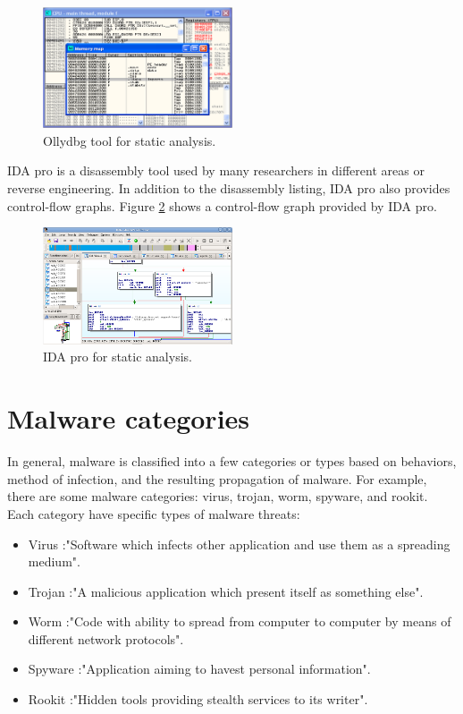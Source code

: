 \begin{figure}[h!]
\centering
\includegraphics[width=0.5\textwidth]{graph/OllyDbg.png}
\caption{Ollydbg tool for static analysis.}
\label{fig:OllyDbg}
\end{figure}

IDA pro is a disassembly tool used by many researchers in different areas or reverse engineering. In addition to the disassembly listing, IDA pro also provides control-flow graphs. Figure \ref{fig:IDApro} shows a control-flow graph provided by IDA pro.

\begin{figure}[h!]
\centering
\includegraphics[width=0.5\textwidth]{graph/idapro.png}
\caption{IDA pro for static analysis.}
\label{fig:IDApro}
\end{figure}


\section{Malware categories}

In general, malware is classified into a few categories or types based on behaviors, method of infection, and the resulting propagation of malware. For example, there are some malware categories: virus, trojan, worm, spyware, and rookit. Each category have specific types of malware threats:

\begin{itemize}
\item Virus :"Software which infects other application and use them as a spreading medium"\cite{blackhat1}.
\item Trojan :"A malicious application which present itself as something else"\cite{blackhat1}.
\item Worm :"Code with ability to spread from computer to computer by means of different network protocols"\cite{blackhat1}.
\item Spyware :"Application aiming to havest personal information"\cite{blackhat1}.
\item Rookit :"Hidden tools providing stealth services to its writer"\cite{blackhat1}.
\end{itemize}

